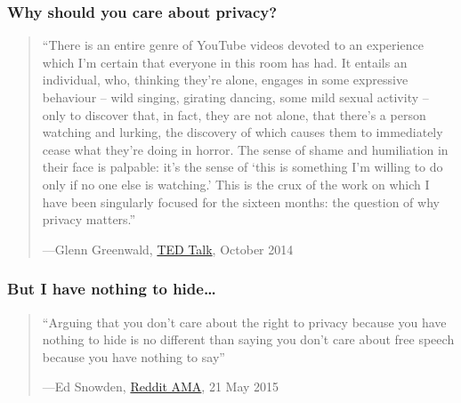 \begin{frame}
  \frametitle{Why should you care about privacy?}
  \begin{quotation}
    ``There is an entire genre of YouTube videos devoted to an experience which
    I'm certain that everyone in this room has had. It entails an individual,
    who, thinking they're alone, engages in some expressive behaviour -- wild
    singing, girating dancing, some mild sexual activity -- only to discover
    that, in fact, they are not alone, that there's a person watching and
    lurking, the discovery of which causes them to immediately cease what
    they're doing in horror. The sense of shame and humiliation in their face is
    palpable: it's the sense of `this is something I'm willing to do only if no
    one else is watching.'  This is the crux of the work on which I have been
    singularly focused for the sixteen months: the question of why privacy matters.'' \\
    \hfill{\raggedright---Glenn Greenwald,
      \href{https://www.youtube.com/watch?v=pcSlowAhvUk}{TED Talk}, October 2014}
  \end{quotation}
\end{frame}


\begin{frame}
  \frametitle{But I have nothing to hide…}
  \begin{quotation}
    ``Arguing that you don't care about the right to privacy because you have
    nothing to hide is no different than saying you don't care about free speech
    because you have nothing to say'' \\
    \hfill{\raggedright---Ed Snowden,
      \href{https://www.reddit.com/r/IAmA/comments/36ru89/just_days_left_to_kill_mass_surveillance_under/crglgh2}{Reddit AMA}, 21 May 2015}
  \end{quotation}
\end{frame}
  

